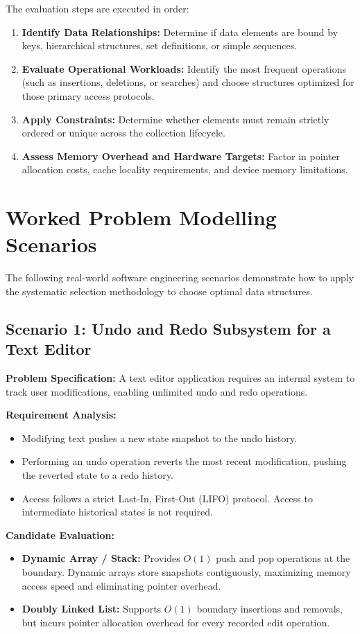 \documentclass[12pt]{report}
\begin{document}
The evaluation steps are executed in order:
\begin{enumerate}
    \item \textbf{Identify Data Relationships:} Determine if data elements are bound by keys, hierarchical structures, set definitions, or simple sequences.
    \item \textbf{Evaluate Operational Workloads:} Identify the most frequent operations (such as insertions, deletions, or searches) and choose structures optimized for those primary access protocols.
    \item \textbf{Apply Constraints:} Determine whether elements must remain strictly ordered or unique across the collection lifecycle.
    \item \textbf{Assess Memory Overhead and Hardware Targets:} Factor in pointer allocation costs, cache locality requirements, and device memory limitations.
\end{enumerate}

\section{Worked Problem Modelling Scenarios}

The following real-world software engineering scenarios demonstrate how to apply the systematic selection methodology to choose optimal data structures.

\subsection{Scenario 1: Undo and Redo Subsystem for a Text Editor}

\textbf{Problem Specification:} A text editor application requires an internal system to track user modifications, enabling unlimited undo and redo operations.

\textbf{Requirement Analysis:}
\begin{itemize}
    \item Modifying text pushes a new state snapshot to the undo history.
    \item Performing an undo operation reverts the most recent modification, pushing the reverted state to a redo history.
    \item Access follows a strict Last-In, First-Out (LIFO) protocol. Access to intermediate historical states is not required.
\end{itemize}

\textbf{Candidate Evaluation:}
\begin{itemize}
    \item \textbf{Dynamic Array / Stack:} Provides $O(1)$ push and pop operations at the boundary. Dynamic arrays store snapshots contiguously, maximizing memory access speed and eliminating pointer overhead.
    \item \textbf{Doubly Linked List:} Supports $O(1)$ boundary insertions and removals, but incurs pointer allocation overhead for every recorded edit operation.
\end{itemize}
\end{document}
